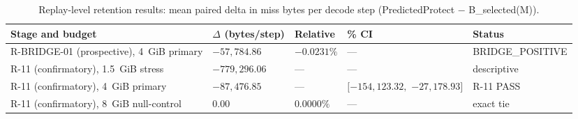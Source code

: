 \begin{table}[t]
\centering
\caption{Replay-level retention results: mean paired delta in miss bytes
per decode step (PredictedProtect $-$ B\_selected(M)).}
\label{tab:c3-retention}
\small
\setlength{\tabcolsep}{3pt}
\begin{tabularx}{\linewidth}{@{}>{\raggedright\arraybackslash}X
  >{\raggedleft\arraybackslash}p{1.9cm} >{\raggedleft\arraybackslash}p{1.6cm}
  >{\raggedright\arraybackslash}p{4.2cm} >{\raggedright\arraybackslash}p{3.2cm}@{}}
\toprule
Stage and budget & $\Delta$ (bytes/step) & Relative & 95\% CI & Status \\
\midrule
R-BRIDGE-01 (prospective), 4~GiB primary & $-57{,}784.86$ & $-0.0231\%$ & --- & BRIDGE\_POSITIVE \\
R-11 (confirmatory), 1.5~GiB stress & $-779{,}296.06$ & --- & --- & descriptive \\
R-11 (confirmatory), 4~GiB primary & $-87{,}476.85$ & --- & $[-154{,}123.32,$ $-27{,}178.93]$ & R-11 PASS \\
R-11 (confirmatory), 8~GiB null-control & $0.00$ & $0.0000\%$ & --- & exact tie \\
\bottomrule
\end{tabularx}
\end{table}
